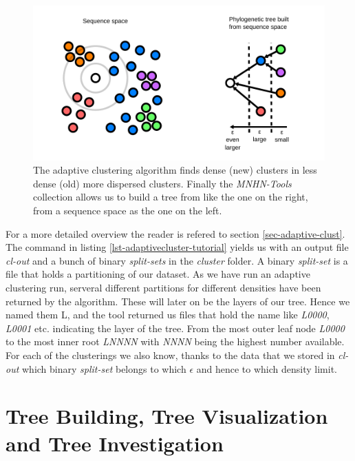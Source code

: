 \begin{figure}
  \includegraphics{densities-space.pdf}
  \caption{The adaptive clustering algorithm finds dense (new)
    clusters in less dense (old) more dispersed clusters. Finally the
    \emph{MNHN-Tools} collection allows us to build a tree from like
    the one on the right, from a sequence space as the one on the
    left.}
  \label{fig-adaptive-cluster}
\end{figure}
For a more detailed overview the reader is refered to section
\ref{sec-adaptive-clust}. 
The command in listing \ref{lst-adaptivecluster-tutorial} yields us
with an output file \emph{cl-out} and a bunch of binary
\emph{split-sets} in the
\emph{cluster} folder. A binary \emph{split-set} is a file that holds
a partitioning of our dataset. As we have run an adaptive clustering
run, serveral different partitions for different densities have been
returned by the algorithm. These will later on be the layers of our
tree. Hence we named them L, and the tool returned us files that hold
the name like \emph{L0000}, \emph{L0001} etc. indicating the layer of
the tree. From the most outer leaf node \emph{L0000} to the most inner
root \emph{LNNNN} with \emph{NNNN} being the highest number
available. For each of the clusterings we also know, thanks to the
data that we stored in \emph{cl-out} which binary \emph{split-set}
belongs to which $\epsilon$ and hence to which density limit.

\section{Tree Building, Tree Visualization and Tree Investigation}

